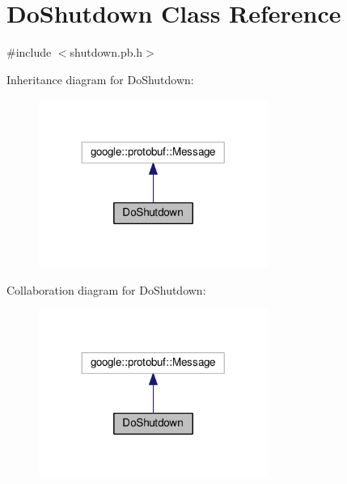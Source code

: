\hypertarget{class_do_shutdown}{}\section{Do\+Shutdown Class Reference}
\label{class_do_shutdown}


{\ttfamily \#include $<$shutdown.\+pb.\+h$>$}



Inheritance diagram for Do\+Shutdown\+:
\nopagebreak
\begin{figure}[H]
\begin{center}
\leavevmode
\includegraphics[width=212pt]{class_do_shutdown__inherit__graph}
\end{center}
\end{figure}


Collaboration diagram for Do\+Shutdown\+:
\nopagebreak
\begin{figure}[H]
\begin{center}
\leavevmode
\includegraphics[width=212pt]{class_do_shutdown__coll__graph}
\end{center}
\end{figure}
